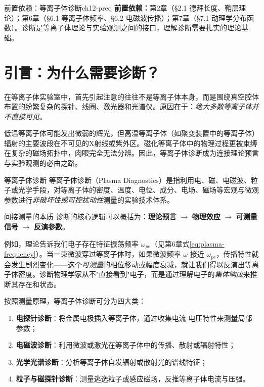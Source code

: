 \documentclass[12pt,a4paper,openany,oneside]{book}
\begin{document}
\begin{tip}{前置依赖：等离子体诊断}{ch12-preq}
\textbf{前置依赖：}第2章（\S2.1 德拜长度、鞘层理论）；第6章（\S6.1 等离子体频率、\S6.2 电磁波传播）；第7章（\S7.1 动理学分布函数）。诊断是等离子体理论与实验观测之间的接口，理解诊断需要扎实的理论基础。
\end{tip}

\section{引言：为什么需要诊断？}
\label{sec:12.1}

在等离子体实验室中，首先引起注意的往往不是等离子体本身，而是围绕真空腔体布置的纷繁复杂的探针、线圈、激光器和光谱仪。原因在于：\emph{绝大多数等离子体并不直接可见}。

低温等离子体可能发出微弱的辉光，但高温等离子体（如聚变装置中的等离子体）辐射的主要波段在不可见的X射线或紫外区。磁化等离子体中的物理过程更被束缚在复杂的磁场拓扑中，肉眼完全无法分辨。因此，等离子体诊断成为连接理论预言与实验观测的必由之路。

\begin{definition}{等离子体诊断}{}{}
等离子体诊断（Plasma Diagnostics）是指利用电、磁、电磁波、粒子或光学手段，对等离子体的密度、温度、电位、成分、电场、磁场等宏观与微观参数进行\emph{非破坏性或可控扰动性}测量的实验技术体系。
\end{definition}

\begin{insight}{间接测量的本质}{}
诊断的核心逻辑可以概括为：\textbf{理论预言} $\rightarrow$ \textbf{物理效应} $\rightarrow$ \textbf{可测量信号} $\rightarrow$ \textbf{反演参数}。

例如，理论告诉我们电子存在特征振荡频率 $\omega_{pe}$（见第6章式\eqref{eq:plasma-frequency}）。当一束微波穿过等离子体时，如果微波频率 $\omega$ 接近 $\omega_{pe}$，传播特性就会发生剧烈变化——这个\emph{可测量}的相位移动或幅度衰减，就让我们得以反演出等离子体密度。诊断物理学家从不"直接看到"电子，而是通过理解电子的\emph{集体响应}来推断其存在和状态。
\end{insight}

按照测量原理，等离子体诊断可分为四大类：
\begin{enumerate}
    \item \textbf{电探针诊断}：将金属电极插入等离子体，通过收集电流-电压特性来测量局部参数；
    \item \textbf{电磁波诊断}：利用微波或激光在等离子体中的传播、散射或辐射特性；
    \item \textbf{光学光谱诊断}：分析等离子体自发辐射或散射光的谱线特征；
    \item \textbf{粒子与磁探针诊断}：测量逃逸粒子或感应磁场，反推等离子体电流与压强。
\end{enumerate}
\end{document}

